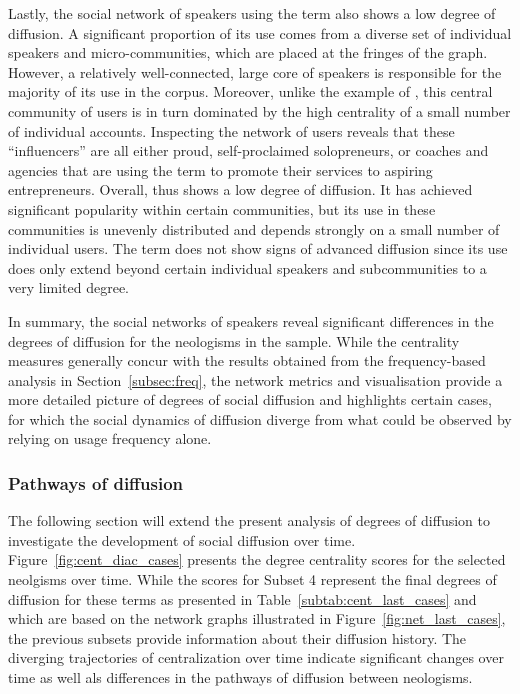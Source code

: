 \documentclass[
  a4paper,
  abstract=on,
  captions=tableabove
  ]{scrartcl}
\begin{document}
      Lastly, the social network of speakers using the term  also shows a low degree of diffusion. A significant proportion of its use comes from a diverse set of individual speakers and micro-communities, which are placed at the fringes of the graph. However, a relatively well-connected, large core of speakers is responsible for the majority of its use in the corpus. Moreover, unlike the example of , this central community of users is in turn dominated by the high centrality of a small number of individual accounts. Inspecting the network of users reveals that these \enquote{influencers} are all either proud, self-proclaimed solopreneurs, or coaches and agencies that are using the term to promote their services to aspiring entrepreneurs. Overall,  thus shows a low degree of diffusion. It has achieved significant popularity within certain communities, but its use in these communities is unevenly distributed and depends strongly on a small number of individual users. The term does not show signs of advanced diffusion since its use does only extend beyond certain individual speakers and subcommunities to a very limited degree.

      In summary, the social networks of speakers reveal significant differences in the degrees of diffusion for the neologisms in the sample. While the centrality measures generally concur with the results obtained from the frequency-based analysis in Section~\ref{subsec:freq}, the network metrics and visualisation provide a more detailed picture of degrees of social diffusion and highlights certain cases, for which the social dynamics of diffusion diverge from what could be observed by relying on usage frequency alone.


    \subsubsection{Pathways of diffusion}

      The following section will extend the present analysis of degrees of diffusion to investigate the development of social diffusion over time. Figure~\ref{fig:cent_diac_cases} presents the degree centrality scores for the selected neolgisms over time. While the scores for Subset 4 represent the final degrees of diffusion for these terms as presented in Table~\ref{subtab:cent_last_cases} and which are based on the network graphs illustrated in Figure~\ref{fig:net_last_cases}, the previous subsets provide information about their diffusion history. The diverging trajectories of centralization over time indicate significant changes over time as well als differences in the pathways of diffusion between neologisms.
\end{document}
